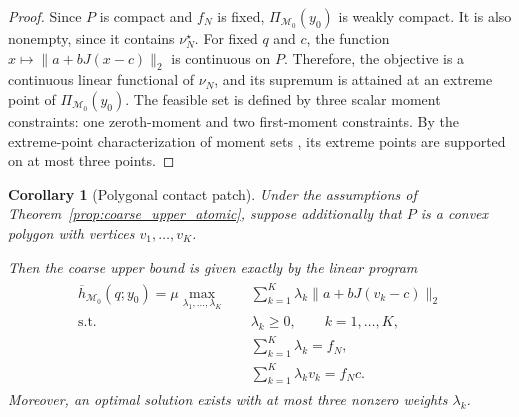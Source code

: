 \documentclass[11pt,a4paper]{article}
\theoremstyle{proposition}
\newtheorem{corollary}[theorem]{Corollary}
\begin{document}
\begin{proof}
    Since $P$ is compact and $f_N$ is fixed, $\Pi_{\mathcal M_0}(y_0)$ is weakly compact.
    It is also nonempty, since it contains $\nu_N^\star$. For fixed $q$ and $c$, the function
    $x\mapsto\|a+bJ(x-c)\|_2$ is continuous on $P$.
    Therefore, the objective is a continuous linear
    functional of $\nu_N$, and its supremum is attained
    at an extreme point of $\Pi_{\mathcal M_0}(y_0)$.    The feasible set is defined by three scalar
    moment constraints: one zeroth-moment and two
    first-moment constraints. By the extreme-point
    characterization of moment sets
    \cite{winkler1988extreme}, its extreme points
    are supported on at most three points.
\end{proof}

\begin{corollary}[Polygonal contact patch]
\label{cor:coarse_upper_polygon}
    Under the assumptions of
    Theorem~\ref{prop:coarse_upper_atomic},
    suppose additionally that $P$ is a convex polygon
    with vertices $v_1,\ldots,v_K$.

    Then the coarse upper bound is given exactly by
    the linear program
    \begin{align}
    \boxed{
    \begin{aligned}
        \overline h_{\mathcal M_0}(q;y_0)
        =
        \mu\max_{\lambda_1,\ldots,\lambda_K}\quad&
        \sum_{k=1}^K
        \lambda_k\|a+bJ(v_k-c)\|_2\\
        \text{s.t.}\quad&
        \lambda_k\geq0,\qquad k=1,\ldots,K,\\
        &
        \sum_{k=1}^K\lambda_k=f_N,\\
        &
        \sum_{k=1}^K\lambda_kv_k=f_Nc.
    \end{aligned}}
    \end{align}
    Moreover, an optimal solution exists with
    at most three nonzero weights $\lambda_k$.
\end{corollary}
\end{document}
